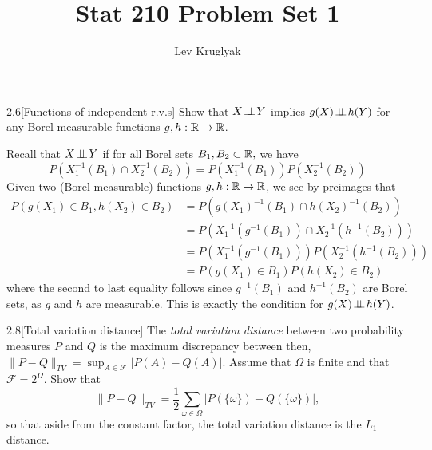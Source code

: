 \documentclass{pset}
\title{Stat 210 Problem Set 1}
\author{Lev Kruglyak}
\begin{document}
\maketitle
\collaborators

\begin{problem}{2.6}[Functions of independent r.v.s]
    Show that $X\!\perp\!\!\!\perp\! Y$ implies $g(X)\!\perp\!\!\!\perp\! h(Y)$ for any Borel measurable functions $g,h : \mathbb{R} \to \mathbb{R}$.
\end{problem}

\begin{solution}
    Recall that $X\!\perp\!\!\!\perp\! Y$ if for all Borel sets $B_1,B_2\subset \mathbb{R},$ we have \[P(X_1^{-1}(B_1)\cap X_2^{-1}(B_2)) = P(X_1^{-1}(B_1))P(X_2^{-1}(B_2))\]
    Given two (Borel measurable) functions $g, h : \mathbb{R} \to \mathbb{R}$, we see by preimages that
    \[
        \begin{aligned}
            P(g(X_1)\in B_1, h(X_2)\in B_2) &=P(g(X_1)^{-1}(B_1)\cap h(X_2)^{-1}(B_2)) \\
            &= P(X_1^{-1}(g^{-1}(B_1))\cap X_2^{-1}(h^{-1}(B_2)))\\
            &= P(X_1^{-1}(g^{-1}(B_1)))P(X_2^{-1}(h^{-1}(B_2)))\\
            &= P(g(X_1)\in B_1)P(h(X_2)\in B_2)
        \end{aligned}
    \] 
    where the second to last equality follows since $g^{-1}(B_1)$ and $h^{-1}(B_2)$ are Borel sets, as $g$ and $h$ are measurable. This is exactly the condition for $g(X)\!\perp\!\!\!\perp\! h(Y)$.
\end{solution}

\begin{problem}{2.8}[Total variation distance]
    The \emph{total variation distance} between two probability measures $P$ and $Q$ is the maximum discrepancy between then, $\|P-Q\|_{TV} =\sup_{A\in \mathcal{F}}|P(A)-Q(A)|$. Assume that $\Omega$ is finite and that $\mathcal{F}=2^\Omega$. Show that
    \[
        \|P-Q\|_{TV} = \frac{1}{2}\sum_{\omega\in \Omega}|P(\{\omega\}) - Q(\{\omega\})|,
    \]
    so that aside from the constant factor, the total variation distance is the $L_1$ distance.
\end{problem}
\end{document}
